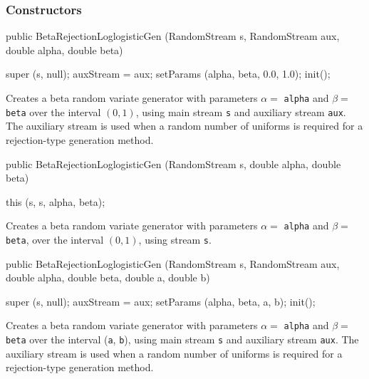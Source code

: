 \subsubsection* {Constructors}
\begin{code}

   public BetaRejectionLoglogisticGen (RandomStream s, RandomStream aux,
                                       double alpha, double beta) \begin{hide} {
      super (s, null);
      auxStream = aux;
      setParams (alpha, beta, 0.0, 1.0);
      init();
   }\end{hide}
\end{code} 
\begin{tabb} Creates a beta random variate generator with parameters $\alpha =$ 
 \texttt{alpha} and $\beta =$ \texttt{beta} over the interval $(0,1)$,
  using main stream \texttt{s} and auxiliary stream \texttt{aux}.
 The auxiliary stream is used when a random number of uniforms
 is required for a rejection-type generation method.
\end{tabb}
\begin{code}

   public BetaRejectionLoglogisticGen (RandomStream s,
                                       double alpha, double beta) \begin{hide} {
      this (s, s, alpha, beta);
   }\end{hide}
\end{code} 
\begin{tabb} Creates a beta random variate generator with parameters $\alpha =$ 
 \texttt{alpha} and $\beta =$ \texttt{beta},  over the interval $(0,1)$,
  using stream \texttt{s}.
\end{tabb}
\begin{code}

   public BetaRejectionLoglogisticGen (RandomStream s, RandomStream aux,
          double alpha, double beta, double a, double b) \begin{hide} {
      super (s, null);
      auxStream = aux;
      setParams (alpha, beta, a, b);
      init();
   }\end{hide}
\end{code} 
\begin{tabb} Creates a beta random variate generator with parameters $\alpha =$ 
 \texttt{alpha} and $\beta =$ \texttt{beta} over the interval
 (\texttt{a}, \texttt{b}), 
  using main stream \texttt{s} and auxiliary stream \texttt{aux}.
 The auxiliary stream is used when a random number of uniforms
 is required for a rejection-type generation method.
\end{tabb}
